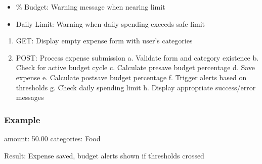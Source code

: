 \documentclass[letterpaper,10pt,english]{sphinxmanual}
\begin{document}
\begin{fulllineitems}
\begin{description}
\begin{itemize}
\item {} 
\% Budget: Warning message when nearing limit

\item {} 
\sphinxAtStartPar
Daily Limit: Warning when daily spending exceeds safe limit

\end{itemize}

\begin{enumerate}
%
\item {} 
\sphinxAtStartPar
GET: Display empty expense form with user’s categories

\item {} 
\sphinxAtStartPar
POST: Process expense submission
a. Validate form and category existence
b. Check for active budget cycle
c. Calculate pre\sphinxhyphen{}save budget percentage
d. Save expense
e. Calculate post\sphinxhyphen{}save budget percentage
f. Trigger alerts based on thresholds
g. Check daily spending limit
h. Display appropriate success/error messages

\end{enumerate}

\end{description}
\subsubsection*{Example}
\begin{description}
\sphinxAtStartPar
amount: 50.00
categories: Food

\end{description}

\sphinxAtStartPar
Result: Expense saved, budget alerts shown if thresholds crossed

\end{fulllineitems}

\end{document}

